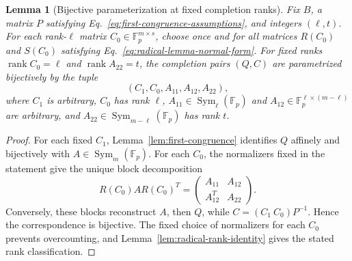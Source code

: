 \documentclass[11pt]{article}
\newcommand{\F}{\mathbb F}
\newcommand{\Sym}{\operatorname{Sym}}
\newcommand{\rank}{\operatorname{rank}}
\newcommand{\1}{\mathbf 1}
\theoremstyle{plain}
\newtheorem{lemma}[theorem]{Lemma}
\theoremstyle{definition}
\theoremstyle{remark}
\begin{document}
\begin{lemma}[Bijective parameterization at fixed completion ranks]
\label{lem:completion-bijective-parameterization}
Fix $B$, a matrix $P$ satisfying
Eq.~\eqref{eq:first-congruence-assumptions}, and integers $(\ell,t)$.  For each
rank-$\ell$ matrix $C_0\in\F_p^{m\times s}$, choose once and for all matrices
$R(C_0)$ and $S(C_0)$ satisfying
Eq.~\eqref{eq:radical-lemma-normal-form}.  For fixed ranks $\rank C_0=\ell$ and $\rank A_{22}=t$, the completion pairs
$(Q,C)$ are parametrized bijectively by the tuple
\begin{equation}
 (C_1,C_0,A_{11},A_{12},A_{22}),
 \label{eq:completion-parameter-tuple}
\end{equation}
where $C_1$ is arbitrary, $C_0$ has rank $\ell$,
$A_{11}\in\Sym_\ell(\F_p)$ and
$A_{12}\in\F_p^{\ell\times(m-\ell)}$ are arbitrary, and
$A_{22}\in\Sym_{m-\ell}(\F_p)$ has rank $t$.
\end{lemma}
\begin{proof}
For each fixed $C_1$, Lemma~\ref{lem:first-congruence} identifies $Q$
affinely and bijectively with $A\in\Sym_m(\F_p)$.  For each $C_0$, the
normalizers fixed in the statement give the unique block decomposition
\[
 R(C_0)AR(C_0)^T
 =\begin{pmatrix}A_{11}&A_{12}\\A_{12}^T&A_{22}\end{pmatrix}.
\]
Conversely, these blocks reconstruct $A$, then $Q$, while
$C=(C_1\ C_0)P^{-1}$.  Hence the correspondence is bijective.  The fixed
choice of normalizers for each $C_0$ prevents overcounting, and
Lemma~\ref{lem:radical-rank-identity} gives the stated rank classification.
\end{proof}
\end{document}
